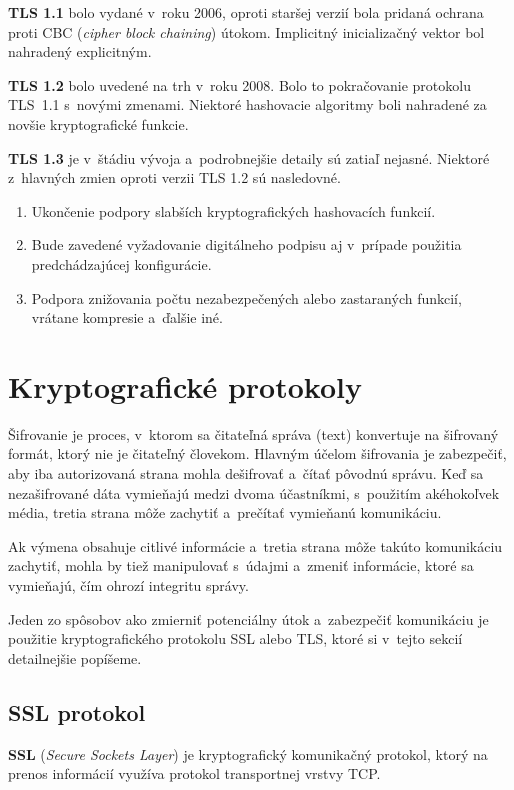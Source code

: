 \textbf{TLS 1.1} bolo vydané v~roku 2006, oproti staršej verzií bola pridaná ochrana proti CBC (\emph{cipher block chaining}) útokom. Implicitný inicializačný vektor bol nahradený explicitným.

\textbf{TLS 1.2} bolo uvedené na trh v~roku 2008. Bolo to pokračovanie protokolu TLS~1.1 s~novými zmenami. Niektoré hashovacie algoritmy boli nahradené za novšie kryptografické funkcie.

\textbf{TLS 1.3} je v~štádiu vývoja a~podrobnejšie detaily sú zatiaľ nejasné. Niektoré z~hlavných zmien oproti verzii TLS 1.2 sú nasledovné.
\begin{enumerate}

\item Ukončenie podpory slabších kryptografických hashovacích funkcií.

\item Bude zavedené vyžadovanie digitálneho podpisu aj v~prípade použitia pred\-chá\-dza\-jú\-cej konfigurácie.

\item Podpora znižovania počtu nezabezpečených alebo zastaraných funkcií, vrátane kompresie a~ďalšie iné. \cite{tls-ssl-history}

\end{enumerate}

\section{Kryptografické protokoly}
Šifrovanie je proces, v~ktorom sa čitateľná správa (text) konvertuje na šifrovaný formát, ktorý nie je čitateľný človekom. Hlavným účelom šifrovania je zabezpečiť, aby iba autorizovaná strana mohla dešifrovať a~čítať pôvodnú správu. Keď sa nezašifrované dáta vymieňajú medzi dvoma účastníkmi, s~použitím akéhokoľvek média, tretia strana môže zachytiť a~prečítať vymieňanú komunikáciu.

Ak výmena obsahuje citlivé informácie a~tretia strana môže takúto komunikáciu zachytiť, mohla by tiež manipulovať s~údajmi a~zmeniť informácie, ktoré sa vymieňajú, čím ohrozí integritu správy.
	
Jeden zo spôsobov ako zmierniť potenciálny útok a~zabezpečiť komunikáciu je použitie  kryptografického protokolu SSL alebo TLS, ktoré si v~tejto sekcií detailnejšie popíšeme. 

\subsection{SSL protokol}
\textbf{SSL} (\emph{Secure Sockets Layer}) je kryptografický komunikačný protokol, ktorý na prenos informácií využíva protokol transportnej vrstvy TCP.


